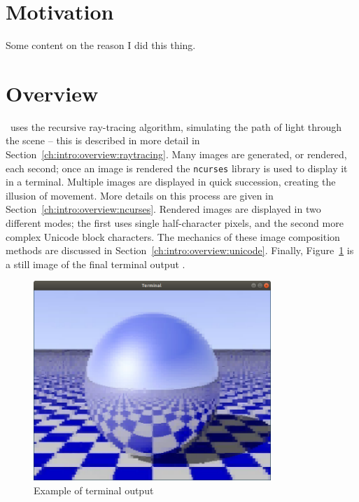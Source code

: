 \section{Motivation} \label{ch:intro:motivation}

Some content on the reason I did this thing.

\section{Overview}
\label{ch:intro:overview}

\name\ uses the recursive ray-tracing algorithm, simulating the path of light through the scene -- this is described in more detail in Section~\ref{ch:intro:overview:raytracing}.
Many images are generated, or rendered, each second; once an image is rendered the \texttt{ncurses} library \cite{ncursesLibrary} is used to display it in a terminal.
Multiple images are displayed in quick succession, creating the illusion of movement.
More details on this process are given in Section~\ref{ch:intro:overview:ncurses}.
Rendered images are displayed in two different modes; the first uses single half-character pixels, and the second more complex Unicode block characters.
The mechanics of these image composition methods are discussed in Section~\ref{ch:intro:overview:unicode}. Finally, Figure~\ref{fig:checker_metal} is a still image of the final terminal output .

\begin{figure}[htb]
  \centering
  \includegraphics[width=0.8\textwidth]{resources/checker_metal}
  \caption{Example of terminal output}
  \label{fig:checker_metal}
\end{figure}

